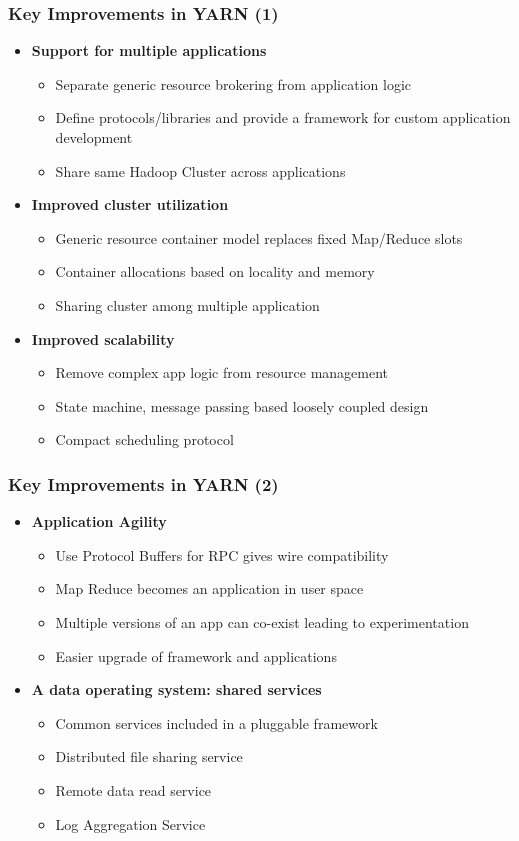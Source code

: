 \begin{frame}
\frametitle{Key Improvements in YARN (1)}
\begin{itemize}
  \item {\bf Support for multiple applications}
  \begin{itemize}
    \item Separate generic resource brokering from application logic
    \item Define protocols/libraries and provide a framework for custom application development
    \item Share same Hadoop Cluster across applications
  \end{itemize}
  \item {\bf Improved cluster utilization}
  \begin{itemize}
    \item Generic resource container model replaces fixed Map/Reduce slots
    \item Container allocations based on locality and memory
    \item Sharing cluster among multiple application
  \end{itemize}
  \item {\bf Improved scalability}
  \begin{itemize}
    \item Remove complex app logic from resource management
    \item State machine, message passing based loosely coupled design
    \item Compact scheduling protocol
  \end{itemize}
\end{itemize}
\end{frame}

\begin{frame}
\frametitle{Key Improvements in YARN (2)}
\begin{itemize}
  \item {\bf Application Agility}
  \begin{itemize}
    \item Use Protocol Buffers for RPC gives wire compatibility
    \item Map Reduce becomes an application in user space
    \item Multiple versions of an app can co-exist leading to experimentation
    \item Easier upgrade of framework and applications
  \end{itemize}
  \item {\bf A data operating system: shared services}
  \begin{itemize}
    \item Common services included in a pluggable framework
    \item Distributed file sharing service
    \item Remote data read service
    \item Log Aggregation Service
  \end{itemize}
\end{itemize}
\end{frame}

